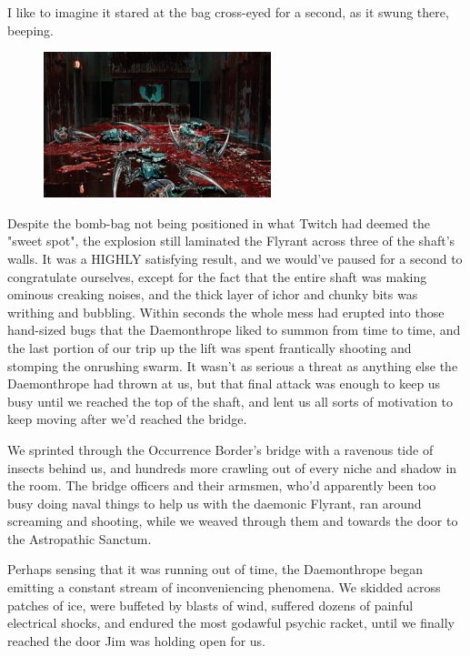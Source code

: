I like to imagine it stared at the bag cross-eyed for a second, as it swung there, beeping.

\begin{figure}
	\begin{center}
		\includegraphics[width=\figwidth]{pics/15/70.png}
	\end{center}
\end{figure}
Despite the bomb-bag not being positioned in what Twitch had deemed the "sweet spot", the explosion still laminated the Flyrant across three of the shaft's walls. 
It was a HIGHLY satisfying result, and we would've paused for a second to congratulate ourselves, except for the fact that the entire shaft was making ominous creaking noises, and the thick layer of ichor and chunky bits was writhing and bubbling. 
Within seconds the whole mess had erupted into those hand-sized bugs that the Daemonthrope liked to summon from time to time, and the last portion of our trip up the lift was spent frantically shooting and stomping the onrushing swarm. 
It wasn't as serious a threat as anything else the Daemonthrope had thrown at us, but that final attack was enough to keep us busy until we reached the top of the shaft, and lent us all sorts of motivation to keep moving after we'd reached the bridge. 


We sprinted through the Occurrence Border's bridge with a ravenous tide of insects behind us, and hundreds more crawling out of every niche and shadow in the room. 
The bridge officers and their armsmen, who'd apparently been too busy doing naval things to help us with the daemonic Flyrant, ran around screaming and shooting, while we weaved through them and towards the door to the Astropathic Sanctum. 


Perhaps sensing that it was running out of time, the Daemonthrope began emitting a constant stream of inconveniencing phenomena. 
We skidded across patches of ice, were buffeted by blasts of wind, suffered dozens of painful electrical shocks, and endured the most godawful psychic racket, until we finally reached the door Jim was holding open for us.

